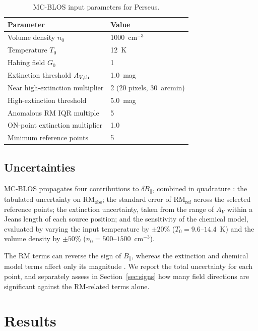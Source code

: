 \documentclass[twocolumn]{aastex701}
\begin{document}
  \begin{table}
  \centering
  \caption{MC-BLOS input parameters for Perseus.}
  \label{tab:params}
  \begin{tabular}{ll}
  \hline
  Parameter & Value \\
  \hline

  Volume density $n_0$ & 1000~cm$^{-3}$ \\
  Temperature $T_0$ & 12~K \\
  Habing field $G_0$ & 1 \\
  Extinction threshold $A_{V,\rm th}$ & 1.0~mag \\
  Near high-extinction multiplier & 2 (20 pixels, 30~arcmin) \\
  High-extinction threshold & 5.0~mag \\
  Anomalous RM IQR multiple & 5 \\
  ON-point extinction multiplier & 1.0 \\
  Minimum reference points & 5 \\
  \hline
  \end{tabular}
  \end{table}

  \subsection{Uncertainties}

  MC-BLOS propagates four contributions to $\delta B_\parallel$, combined in
  quadrature \citep[Equation~5 of][]{tahani2025mcblos}: the tabulated
  uncertainty on $\mathrm{RM_{obs}}$; the standard error of $\mathrm{RM_{ref}}$
  across the selected reference points; the extinction uncertainty, taken from
  the range of $A_V$ within a Jeans length of each source position; and the
  sensitivity of the chemical model, evaluated by varying the input temperature
  by $\pm 20\%$ ($T_0 = 9.6$--$14.4$~K) and the volume density by $\pm 50\%$
  ($n_0 = 500$--$1500$~cm$^{-3}$).

  The RM terms can reverse the sign of $B_\parallel$, whereas the extinction and
  chemical model terms affect only its magnitude \citep{tahani2025mcblos}. We report the total uncertainty for each point, and separately assess in
Section~\ref{sec:signs} how many field directions are significant against the
RM-related terms alone.
\section{Results}
\label{sec:results}
\end{document}
